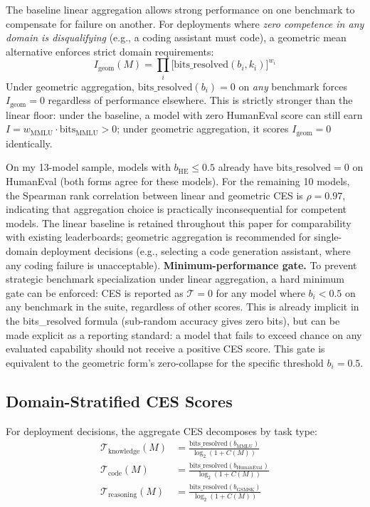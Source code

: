 \documentclass[12pt]{article}
\begin{document}
The baseline linear aggregation allows strong performance on one benchmark to compensate for failure on another. For deployments where \textit{zero competence in any domain is disqualifying} (e.g., a coding assistant must code), a geometric mean alternative enforces strict domain requirements:
\begin{equation}
I_{\mathrm{geom}}(M) = \prod_{i} \bigl[\text{bits\_resolved}(b_i, k_i)\bigr]^{w_i}
\end{equation}
Under geometric aggregation, $\text{bits\_resolved}(b_i) = 0$ on \textit{any} benchmark forces $I_{\mathrm{geom}} = 0$ regardless of performance elsewhere. This is strictly stronger than the linear floor: under the baseline, a model with zero HumanEval score can still earn $I = w_{\text{MMLU}} \cdot \text{bits}_{\text{MMLU}} > 0$; under geometric aggregation, it scores $I_{\text{geom}} = 0$ identically.

On my 13-model sample, models with $b_{\text{HE}} \leq 0.5$ already have $\text{bits\_resolved} = 0$ on HumanEval (both forms agree for these models). For the remaining 10 models, the Spearman rank correlation between linear and geometric CES is $\rho = 0.97$, indicating that aggregation choice is practically inconsequential for competent models. The linear baseline is retained throughout this paper for comparability with existing leaderboards; geometric aggregation is recommended for single-domain deployment decisions (e.g., selecting a code generation assistant, where any coding failure is unacceptable). \textbf{Minimum-performance gate.} To prevent strategic benchmark specialization under linear aggregation, a hard minimum gate can be enforced: CES is reported as $\mathcal{T} = 0$ for any model where $b_i < 0.5$ on any benchmark in the suite, regardless of other scores. This is already implicit in the bits\_resolved formula (sub-random accuracy gives zero bits), but can be made explicit as a reporting standard: a model that fails to exceed chance on any evaluated capability should not receive a positive CES score. This gate is equivalent to the geometric form's zero-collapse for the specific threshold $b_i = 0.5$.

\subsection{Domain-Stratified CES Scores}

For deployment decisions, the aggregate CES decomposes by task type:
\begin{align}
\mathcal{T}_{\text{knowledge}}(M) &= \frac{\text{bits\_resolved}(b_{\text{MMLU}})}{\log_2(1+C(M))} \\
\mathcal{T}_{\text{code}}(M)      &= \frac{\text{bits\_resolved}(b_{\text{HumanEval}})}{\log_2(1+C(M))} \\
\mathcal{T}_{\text{reasoning}}(M) &= \frac{\text{bits\_resolved}(b_{\text{GSM8K}})}{\log_2(1+C(M))}
\end{align}
\end{document}
